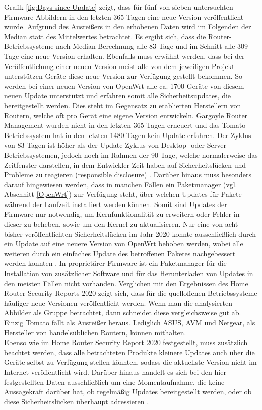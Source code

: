 \documentclass[a4paper]{book}
\begin{document}
\begin{large}
\begin{onehalfspace}
 	Grafik \ref{fig:Days since Update} zeigt, dass für fünf von sieben untersuchten Firmware-Abbildern in den letzten 365 Tagen eine neue Version veröffentlicht wurde. Aufgrund des Ausreißers in den erhobenen Daten wird im Folgenden der Median statt des Mittelwertes betrachtet.  Es ergibt sich, dass die Router-Betriebssysteme nach Median-Berechnung alle 83 Tage und im Schnitt alle 309 Tage eine neue Version erhalten. Ebenfalls muss erwähnt werden, dass bei der Veröffentlichung einer neuen Version meist alle von dem jeweiligen Projekt unterstützen Geräte diese neue Version zur Verfügung gestellt bekommen. So werden bei einer neuen Version von OpenWrt alle ca. 1700 Geräte von diesem neuen Update unterstützt und erfahren somit alle Sicherheitsupdates, die bereitgestellt werden. Dies steht im Gegensatz zu etablierten Herstellern von Routern, welche oft pro Gerät eine eigene Version entwickeln. Gargoyle Router Management wurden nicht in den letzten 365 Tagen erneuert und das Tomato Betriebssystem hat in den letzten 1480 Tagen kein Update erfahren. Der Zyklus von 83 Tagen ist höher als der Update-Zyklus von Desktop- oder Server-Betriebssystemen, jedoch noch im Rahmen der 90 Tage, welche normalerweise das Zeitfenster darstellen, in dem Entwickler Zeit haben auf Sicherheitslücken und Probleme zu reagieren (\glqq responsible disclosure\grqq ) \cite{Lazarov.2019}. Darüber hinaus muss besonders darauf hingewiesen werden, dass in manchen Fällen ein Paketmanager (vgl. Abschnitt \ref{OpenWrt}) zur Verfügung steht, über welchen Updates für Pakete während der Laufzeit installiert werden können. Somit sind Updates der Firmware nur notwendig, um Kernfunktionalität zu erweitern oder Fehler in dieser zu beheben, sowie um den Kernel zu aktualisieren. Nur eine von acht bisher veröffentlichten Sicherheitslücken im Jahr 2020 konnte ausschließlich durch ein Update auf eine neuere Version von OpenWrt behoben werden, wobei alle weiteren durch ein einfaches Update des betroffenen Paketes nachgebessert werden konnten \cite{OpenWrtSecurity}. In proprietärer Firmware ist ein Paketmanager für die Installation von zusätzlicher Software und für das Herunterladen von Updates in den meisten Fällen nicht vorhanden. Verglichen mit den Ergebnissen des \glqq Home Router Security Reports 2020\grqq{} zeigt sich, dass für die quelloffenen Betriebssysteme häufiger neue Versionen veröffentlicht werden. Wenn man die analysierten Abbilder als Gruppe betrachtet, dann schneidet diese vergleichsweise gut ab. Einzig Tomato fällt als Ausreißer heraus. Lediglich ASUS, AVM und Netgear, als Hersteller von handelsüblichen Routern, können mithalten.	 \\ \indent
 	Ebenso wie im \glqq Home Router Security Report 2020\grqq{} festgestellt, muss zusätzlich beachtet werden, dass alle betrachteten Produkte kleinere Updates auch über die Geräte selbst zu Verfügung stellen könnten, sodass die aktuellste Version nicht im Internet veröffentlicht wird. Darüber hinaus handelt es sich bei den hier festgestellten Daten ausschließlich um eine Momentaufnahme, die keine Aussagekraft darüber hat, ob regelmäßig Updates bereitgestellt werden, oder ob diese Sicherheitslücken überhaupt adressieren \cite{PeterWeidenbachJohannesvomDorp.2020}.



\end{onehalfspace}
\end{large}
\end{document}
